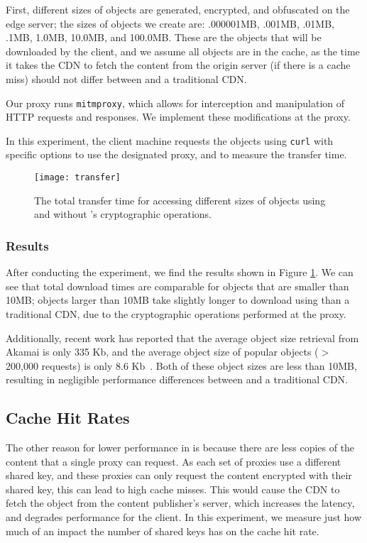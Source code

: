 First, different sizes of objects are generated, encrypted, and obfuscated on the edge server; the sizes of objects we create are: 
.000001MB, .001MB, .01MB, .1MB, 1.0MB, 10.0MB, and 100.0MB.  These are the objects that will be downloaded by the client, and we 
assume all objects are in the cache, as the time it takes the CDN to fetch the content from the origin server (if there is a cache 
miss) should not differ between \system{} and a traditional CDN. 

Our proxy runs {\tt mitmproxy}, which allows for interception and manipulation of HTTP requests and responses.  We implement 
these modifications at the proxy.  

In this experiment, the client machine requests the objects using {\tt curl} with specific options to use the designated proxy, 
and to measure the transfer time.  

\begin{figure}[t]
\centering
\texttt{[image: transfer]}
\caption{The total transfer time for accessing different sizes of objects using \system{} and without \system{}'s cryptographic operations.}
\label{fig:transfer}
\end{figure}

\subsubsection{Results}
After conducting the experiment, we find the results shown in Figure \ref{fig:transfer}.  We can see that total download times are comparable 
for objects that are smaller than 10MB; objects larger than 10MB take slightly longer to download using \system{} than a traditional CDN, 
due to the cryptographic operations performed at the proxy.  

Additionally, recent work has reported that the average object size retrieval from Akamai is only 335 Kb, and the average object size 
of popular objects ($>$ 200,000 requests) is only 8.6 Kb~\cite{berger2016achieving}.  Both of these object sizes are less than 10MB, resulting in negligible 
performance differences between \system{} and a traditional CDN.

\subsection{Cache Hit Rates}
The other reason for lower performance in \system{} is because there are less copies of the content that a single proxy can request.  As each set 
of proxies use a different shared key, and these proxies can only request the content encrypted with their shared key, this can lead to high cache misses.  
This would cause the CDN to fetch the object from the content publisher's server, which increases the latency, and degrades performance for the client.  
In this experiment, we measure just how much of an impact the number of shared keys has on the cache hit rate.

